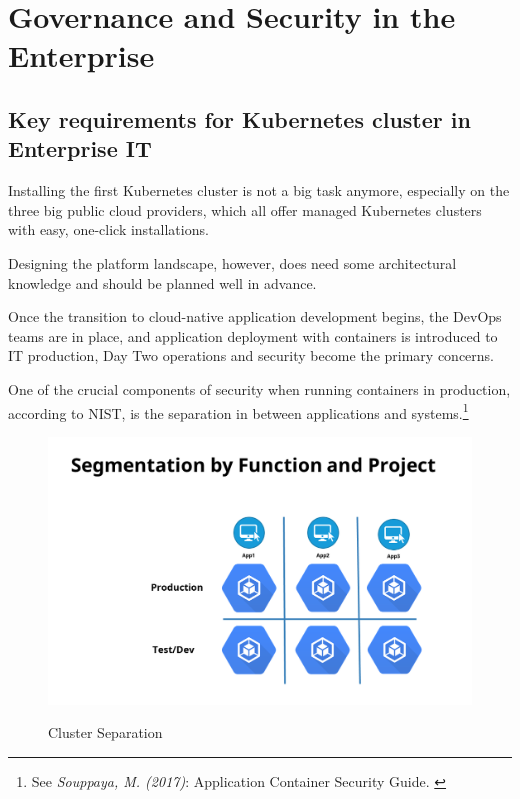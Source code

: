 %
%

\pagebreak
\section{Governance and Security in the Enterprise}

\onehalfspacing

\subsection{Key requirements for Kubernetes cluster in Enterprise IT}

Installing the first Kubernetes cluster is not a big task anymore, especially on the three big public cloud providers, which all offer managed Kubernetes clusters with easy, one-click installations.

Designing the platform landscape, however, does need some architectural knowledge and should be planned well in advance.

Once the transition to cloud-native application development begins, the DevOps teams are in place, and application deployment with containers is introduced to IT production, Day Two operations and security become the primary concerns.

One of the crucial components of security when running containers in production, according to NIST, is the separation in between applications and systems.\footnote{See \textit{Souppaya, M. (2017)}: Application Container Security Guide. \cite{sp800-190}}

\begin{figure}[h]
\centering
\caption {Cluster Separation}
\includegraphics[width=\linewidth]{images/separation}
\label{fig:clusterSeparation}
\end{figure}


